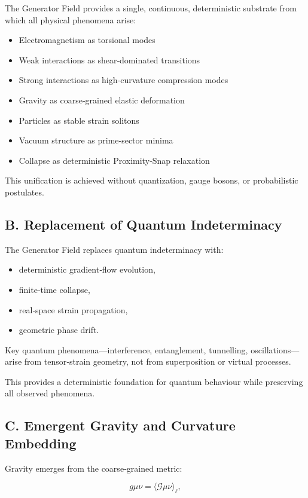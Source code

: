 \documentclass[reprint,amsmath,amssymb,aps,prl,floatfix]{revtex4-2}
\begin{document}
\begin{itemize}
The Generator Field provides a single, continuous, deterministic substrate from which all physical phenomena arise:
\begin{itemize}
\item Electromagnetism as torsional modes  
\item Weak interactions as shear‑dominated transitions  
\item Strong interactions as high‑curvature compression modes  
\item Gravity as coarse‑grained elastic deformation  
\item Particles as stable strain solitons  
\item Vacuum structure as prime‑sector minima  
\item Collapse as deterministic Proximity‑Snap relaxation  
\end{itemize}

This unification is achieved without quantization, gauge bosons, or probabilistic postulates.

\subsection{B. Replacement of Quantum Indeterminacy}

The Generator Field replaces quantum indeterminacy with:

\begin{itemize}
\item deterministic gradient‑flow evolution,  
\item finite‑time collapse,  
\item real‑space strain propagation,  
\item geometric phase drift.
\end{itemize}

Key quantum phenomena—interference, entanglement, tunnelling, oscillations—arise from tensor‑strain geometry, not from superposition or virtual processes.

This provides a deterministic foundation for quantum behaviour while preserving all observed phenomena.

\subsection{C. Emergent Gravity and Curvature Embedding}

Gravity emerges from the coarse‑grained metric:

\[
g{\mu\nu} = \langle \mathcal{G}{\mu\nu} \rangle_\ell,
\]


\end{itemize}
\end{document}
